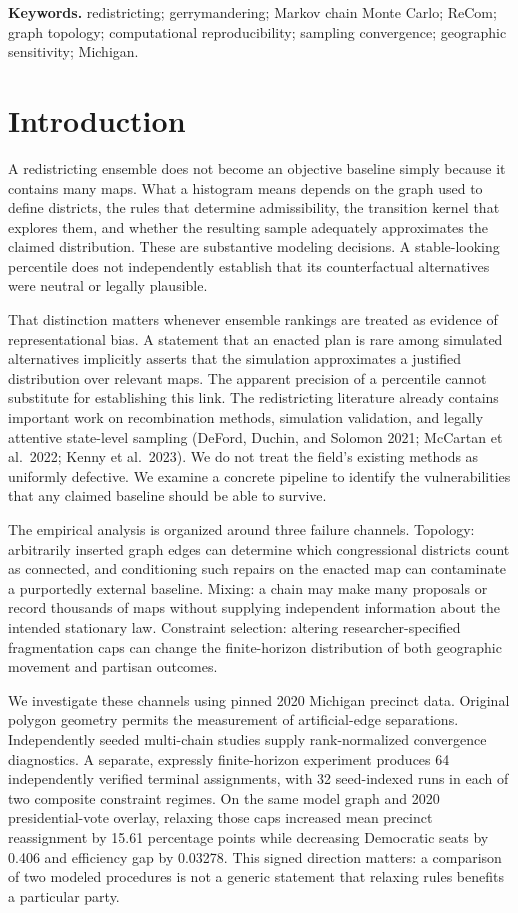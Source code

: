 \documentclass[
  10pt,
]{article}
\begin{document}
\noindent\textbf{Keywords.} redistricting; gerrymandering; Markov chain
Monte Carlo; ReCom; graph topology; computational reproducibility;
sampling convergence; geographic sensitivity; Michigan.

\hypertarget{introduction}{%
\section{Introduction}\label{introduction}}

A redistricting ensemble does not become an objective baseline simply
because it contains many maps. What a histogram means depends on the
graph used to define districts, the rules that determine admissibility,
the transition kernel that explores them, and whether the resulting
sample adequately approximates the claimed distribution. These are
substantive modeling decisions. A stable-looking percentile does not
independently establish that its counterfactual alternatives were
neutral or legally plausible.

That distinction matters whenever ensemble rankings are treated as
evidence of representational bias. A statement that an enacted plan is
rare among simulated alternatives implicitly asserts that the simulation
approximates a justified distribution over relevant maps. The apparent
precision of a percentile cannot substitute for establishing this link.
The redistricting literature already contains important work on
recombination methods, simulation validation, and legally attentive
state-level sampling (DeFord, Duchin, and Solomon 2021; McCartan et
al.~2022; Kenny et al.~2023). We do not treat the field's existing
methods as uniformly defective. We examine a concrete pipeline to
identify the vulnerabilities that any claimed baseline should be able to
survive.

The empirical analysis is organized around three failure channels.
Topology: arbitrarily inserted graph edges can determine which
congressional districts count as connected, and conditioning such
repairs on the enacted map can contaminate a purportedly external
baseline. Mixing: a chain may make many proposals or record thousands of
maps without supplying independent information about the intended
stationary law. Constraint selection: altering researcher-specified
fragmentation caps can change the finite-horizon distribution of both
geographic movement and partisan outcomes.

We investigate these channels using pinned 2020 Michigan precinct data.
Original polygon geometry permits the measurement of artificial-edge
separations. Independently seeded multi-chain studies supply
rank-normalized convergence diagnostics. A separate, expressly
finite-horizon experiment produces 64 independently verified terminal
assignments, with 32 seed-indexed runs in each of two composite
constraint regimes. On the same model graph and 2020 presidential-vote
overlay, relaxing those caps increased mean precinct reassignment by
15.61 percentage points while decreasing Democratic seats by 0.406 and
efficiency gap by 0.03278. This signed direction matters: a comparison
of two modeled procedures is not a generic statement that relaxing rules
benefits a particular party.
\end{document}
